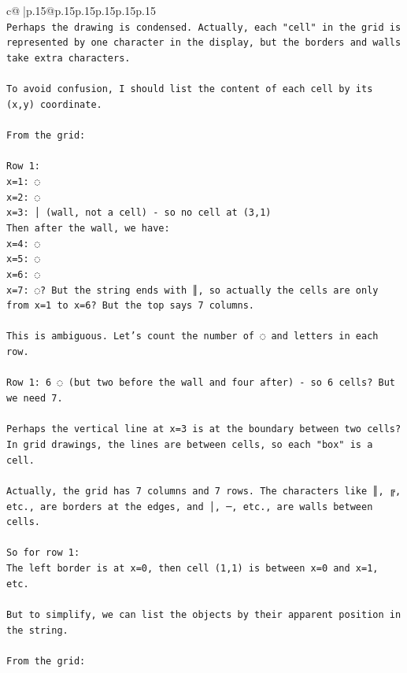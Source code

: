 \documentclass{article}
\begin{document}
{\begin{supertabular}{c@{$\;$}|p{.15\linewidth}@{}p{.15\linewidth}p{.15\linewidth}p{.15\linewidth}p{.15\linewidth}p{.15\linewidth}}
{{{\\ 
\texttt{Perhaps the drawing is condensed. Actually, each "cell" in the grid is represented by one character in the display, but the borders and walls take extra characters.} \\
\\ 
\texttt{To avoid confusion, I should list the content of each cell by its (x,y) coordinate.} \\
\\ 
\texttt{From the grid:} \\
\\ 
\texttt{Row 1: } \\
\texttt{x=1: ◌} \\
\texttt{x=2: ◌} \\
\texttt{x=3: │ (wall, not a cell) {-} so no cell at (3,1)} \\
\texttt{Then after the wall, we have:} \\
\texttt{x=4: ◌} \\
\texttt{x=5: ◌} \\
\texttt{x=6: ◌} \\
\texttt{x=7: ◌? But the string ends with ║, so actually the cells are only from x=1 to x=6? But the top says 7 columns.} \\
\\ 
\texttt{This is ambiguous. Let's count the number of ◌ and letters in each row.} \\
\\ 
\texttt{Row 1: 6 ◌ (but two before the wall and four after) {-} so 6 cells? But we need 7.} \\
\\ 
\texttt{Perhaps the vertical line at x=3 is at the boundary between two cells? In grid drawings, the lines are between cells, so each "box" is a cell.} \\
\\ 
\texttt{Actually, the grid has 7 columns and 7 rows. The characters like ║, ╔, etc., are borders at the edges, and │, ─, etc., are walls between cells.} \\
\\ 
\texttt{So for row 1:} \\
\texttt{The left border is at x=0, then cell (1,1) is between x=0 and x=1, etc.} \\
\\ 
\texttt{But to simplify, we can list the objects by their apparent position in the string.} \\
\\ 
\texttt{From the grid:} \\
}}}
\end{supertabular}}
\end{document}
